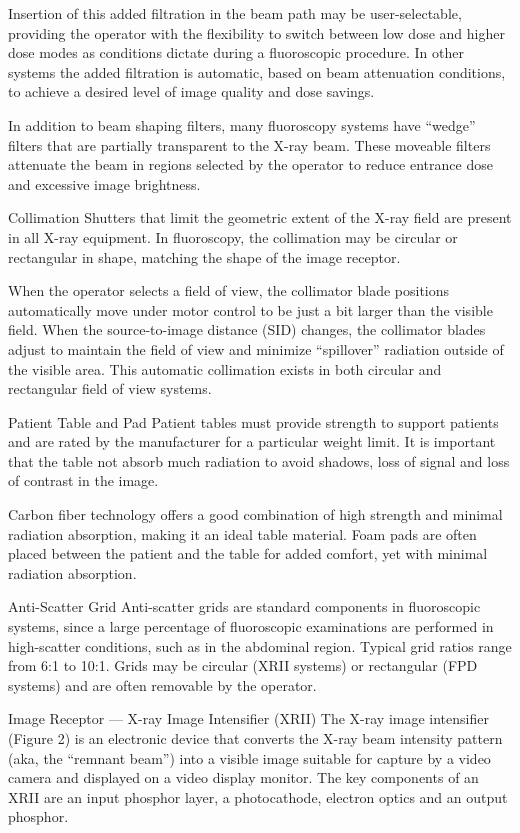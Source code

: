 \documentclass{assignment}
\begin{document}
\begin{problem}
{Insertion of this added filtration in the beam path may be user-selectable, providing the operator with the flexibility to switch between low dose and higher dose modes as conditions dictate during a fluoroscopic procedure. In other systems the added filtration is automatic, based on beam attenuation conditions, to achieve a desired level of image quality and dose savings.

In addition to beam shaping filters, many fluoroscopy systems have “wedge” filters that are partially transparent to the X-ray beam. These moveable filters attenuate the beam in regions selected by the operator to reduce entrance dose and excessive image brightness.

Collimation
Shutters that limit the geometric extent of the X-ray field are present in all X-ray equipment. In fluoroscopy, the collimation may be circular or rectangular in shape, matching the shape of the image receptor.

When the operator selects a field of view, the collimator blade positions automatically move under motor control to be just a bit larger than the visible field. When the source-to-image distance (SID) changes, the collimator blades adjust to maintain the field of view and minimize “spillover” radiation outside of the visible area. This automatic collimation exists in both circular and rectangular field of view systems.

Patient Table and Pad 
Patient tables must provide strength to support patients and are rated by the manufacturer for a particular weight limit. It is important that the table not absorb much radiation to avoid shadows, loss of signal and loss of contrast in the image.

Carbon fiber technology offers a good combination of high strength and minimal radiation absorption, making it an ideal table material. Foam pads are often placed between the patient and the table for added comfort, yet with minimal radiation absorption.

Anti-Scatter Grid
Anti-scatter grids are standard components in fluoroscopic systems, since a large percentage of fluoroscopic examinations are performed in high-scatter conditions, such as in the abdominal region. Typical grid ratios range from 6:1 to 10:1. Grids may be circular (XRII systems) or rectangular (FPD systems) and are often removable by the operator.

Image Receptor — X-ray Image Intensifier (XRII)
The X-ray image intensifier (Figure 2) is an electronic device that converts the X-ray beam intensity pattern (aka, the “remnant beam”) into a visible image suitable for capture by a video camera and displayed on a video display monitor. The key components of an XRII are an input phosphor layer, a photocathode, electron optics and an output phosphor.

}
\end{problem}
\end{document}
